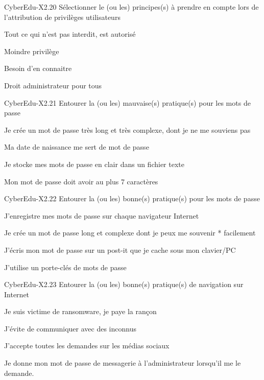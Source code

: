 \begin{multi}[multiple=true]{CyberEdu-X2.20}
	Sélectionner le (ou les) principes(s) à prendre en compte lors de l'attribution de privilèges utilisateurs
\item  Tout ce qui n'est pas interdit, est autorisé
\item*  Moindre privilège
\item*  Besoin d'en connaitre
\item  Droit administrateur pour tous
\end{multi}

\begin{multi}[multiple=true]{CyberEdu-X2.21}
	Entourer la (ou les) mauvaise(s) pratique(s) pour les mots de passe
\item* Je crée un mot de passe très long et très complexe, dont je ne me souviens pas
\item* Ma date de naissance me sert de mot de passe
\item* Je stocke mes mots de passe en clair dans un fichier texte
\item* Mon mot de passe doit avoir au plus 7 caractères
\end{multi}

\begin{multi}[multiple=true]{CyberEdu-X2.22}
	Entourer la (ou les) bonne(s) pratique(s) pour les mots de passe
\item J'enregistre mes mots de passe sur chaque navigateur Internet
\item* Je crée un mot de passe long et complexe dont je peux me souvenir * facilement
\item J'écris mon mot de passe sur un post-it que je cache sous mon clavier/PC
\item* J'utilise un porte-clés de mots de passe
\end{multi}

\begin{multi}[multiple=true]{CyberEdu-X2.23}
	Entourer la (ou les) bonne(s) pratique(s) de navigation sur Internet
\item Je suis victime de ransomware, je paye la rançon
\item* J'évite de communiquer avec des inconnus
\item J'accepte toutes les demandes sur les médias sociaux
\item Je donne mon mot de passe de messagerie à  l'administrateur   lorsqu'il me le demande.
\end{multi}

